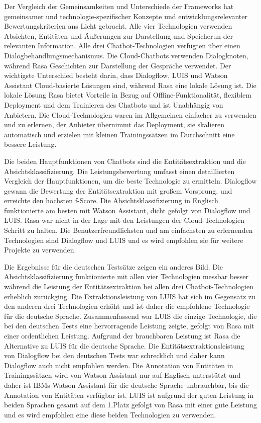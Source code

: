 Der Vergleich der Gemeinsamkeiten und Unterschiede der Frameworks hat gemeinsamer und technologie-spezifischer Konzepte und entwicklungsrelevanter Bewertungskriterien ans Licht gebracht.
Alle vier Technologien verwenden Absichten, Entitäten und Äußerungen zur Darstellung und Speicherun der relevanten Information.
Alle drei Chatbot-Technologien verfügten über einen Dialogbehandlungsmechanismus.
Die Cloud-Chatbots verwenden Dialogknoten, während Rasa Geschichten zur Darstellung der Gespräche verwendet.
Der wichtigste Unterschied besteht darin, dass Dialogflow, LUIS und Watson Assistant Cloud-basierte Lösungen sind, während Rasa eine lokale Lösung ist.
Die lokale Lösung Rasa bietet Vorteile in Bezug auf Offline-Funktionalität, flexiblem Deployment und dem Trainieren des Chatbots und ist Unabhängig von Anbietern.
Die Cloud-Technologien waren im Allgemeinen einfacher zu verwenden und zu erlernen, der Anbieter übernimmt das Deployment, sie skalieren automatisch und erzielen mit kleinen Trainingssätzen im Durchschnitt eine bessere Leistung.

Die beiden Hauptfunktionen von Chatbots sind die Entitätsextraktion und die Absichtsklassifizierung.
Die Leistungsbewertung umfasst einen detaillierten Vergleich der Hauptfunktionen, um die beste Technologie zu ermitteln.
Dialogflow gewann die Bewertung der Entitätsextraktion mit großem Vorsprung, und erreichte den höchsten f-Score.
Die Absichtsklassifizierung in Englisch funktionierte am besten mit Watson Assistant, dicht gefolgt von Dialogflow und LUIS.
Rasa war nicht in der Lage mit den Leistungen der Cloud-Technologien Schritt zu halten.
Die Benutzerfreundlichsten und am einfachsten zu erlernenden Technologien sind Dialogflow und LUIS und es wird empfohlen sie für weitere Projekte zu verwenden.

Die Ergebnisse für die deutschen Testsätze zeigen ein anderes Bild.
Die Absichtsklassifizierung funktionierte mit allen vier Technologien messbar besser während die Leistung der Entitätsextraktion bei allen drei Chatbot-Technologien erheblich zurückging.
Die Extraktionsleistung von LUIS hat sich im Gegensatz zu den anderen drei Technologien erhöht und ist daher die empfohlene Technologie für die deutsche Sprache.
Zusammenfassend war LUIS die einzige Technologie, die bei den deutschen Tests eine hervorragende Leistung zeigte, gefolgt von Rasa mit einer ordentlichen Leistung.
Aufgrund der brauchbaren Leistung ist Rasa die Alternative zu LUIS für die deutsche Sprache.
Die Entitätsextraktionsleistung von Dialogflow bei den deutschen Tests war schrecklich und daher kann Dialogflow auch nicht empfohlen werden.
Die Annotation von Entitäten in Trainingssätzen wird von Watson Assistant nur auf Englisch unterstützt und daher ist IBMs Watson Assistant für die deutsche Sprache unbrauchbar, bis die Annotation von Entitäten verfügbar ist.
LUIS ist aufgrund der guten Leistung in beiden Sprachen gesamt auf dem 1.Platz gefolgt von Rasa mit einer gute Leistung und es wird empfohlen eine diese beiden Technologien zu verwenden.
